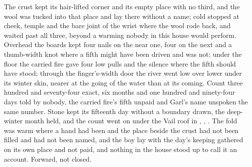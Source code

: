 The crust kept its hair-lifted corner and its empty place with no third, and the wool was tucked into that place and lay there without a name; cold stopped at cheek, temple and the bare joint of the wrist where the wool rode back, and  waited past all three, beyond a warming nobody in this house would perform. Overhead the boards kept four nails on the near one, four on the next and a thumb-width knot where a fifth might have been driven and was not; under the floor the carried fire gave four low pulls and the silence where the fifth should have stood; through the finger's-width door the river went low over lower under its winter skin, nearer at the going of the water than at its coming. Count three hundred and seventy-four exact, six months and one hundred and ninety-four days told by nobody, the carried fire's fifth unpaid and Garl's name unspoken the same number. Stone kept its fifteenth day without a boundary drawn, the deep-winter month held, and the count went on under the Vail roof in , , . The fold was warm where a hand had been and the place beside the crust had not been filled and had not been named, and the boy lay with the day's keeping gathered on its own place and not paid, and nothing in the house stood up to call it an account. Forward, not closed.
